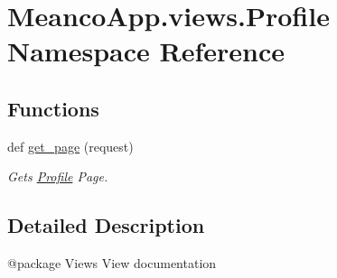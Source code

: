 \hypertarget{namespace_meanco_app_1_1views_1_1_profile}{}\section{Meanco\+App.\+views.\+Profile Namespace Reference}
\label{namespace_meanco_app_1_1views_1_1_profile}
\subsection*{Functions}
\begin{DoxyCompactItemize}
\item 
\hypertarget{namespace_meanco_app_1_1views_1_1_profile_a3ad054f414d33e48eb25a6a746749c8b}{}\label{namespace_meanco_app_1_1views_1_1_profile_a3ad054f414d33e48eb25a6a746749c8b} 
def \hyperlink{namespace_meanco_app_1_1views_1_1_profile_a3ad054f414d33e48eb25a6a746749c8b}{get\+\_\+page} (request)
\begin{DoxyCompactList}\small\item\em Gets \hyperlink{namespace_meanco_app_1_1views_1_1_profile}{Profile} Page. \end{DoxyCompactList}\end{DoxyCompactItemize}


\subsection{Detailed Description}
\begin{DoxyVerb}@package Views
View documentation\end{DoxyVerb}
 